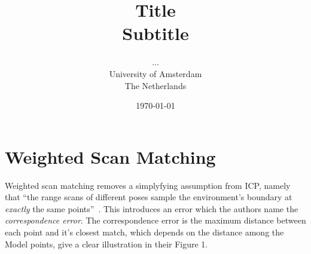 \documentclass[a4paper]{article}
\title{Title\\
{\large Subtitle}}
\author{...\\
  University of Amsterdam\\
  The Netherlands}
\date{\today}
\begin{document}
\maketitle

\section{Weighted Scan Matching}

Weighted scan matching removes a simplyfying assumption from ICP, namely that ``the range scans of different poses sample the environment's boundary at \emph{exactly} the same points''~\cite{pfister2002weighted}. This introduces an error which the authors name the \emph{correspondence error}. The correspondence error is the maximum distance between each point and it's closest match, which depends on the distance among the Model points, \cite{visser2009robust} give a clear illustration in their Figure 1.


{}

\end{document}
